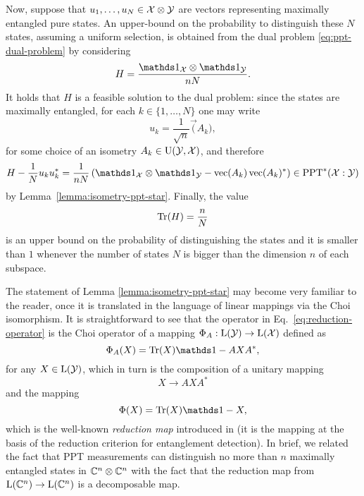 Now, suppose that $u_1,\ldots,u_N\in\mathcal{X}\otimes\mathcal{Y}$ are vectors representing
maximally entangled pure states.
An upper-bound on the probability to distinguish these $N$ states, assuming
a uniform selection, is obtained from the dual problem \eqref{eq:ppt-dual-problem}
by considering
\begin{equation}
  H = \frac{\I_{\X}\otimes\I_{\Y}}{nN}.
\end{equation}
It holds that $H$ is a feasible solution to the dual problem:
since the states are maximally entangled, for each $k\in\{1,\ldots,N\}$ one may write
\begin{equation}
  u_k = \frac{1}{\sqrt{n}}\vec(A_k),
\end{equation}
for some choice of an isometry $A_k\in\mathrm{U}(\mathcal{Y},\mathcal{X})$, and therefore
\begin{equation}
  H - \frac{1}{N}u_k u_k^{\ast} = \frac{1}{nN}\left(
  \I_{\X}\otimes\I_{\Y} - \vec(A_k) \vec(A_k)^{\ast}\right) \in \PPTStar(\X:\Y)
\end{equation}
by Lemma~\ref{lemma:isometry-ppt-star}.
Finally, the value
\begin{equation}
\operatorname{Tr}(H) = \frac{n}{N}
\end{equation}
is an upper bound on the probability of distinguishing the states and it is smaller 
than $1$ whenever the number of states $N$ is bigger than the dimension $n$ of
each subspace.
\begin{remark}
The statement of Lemma \ref{lemma:isometry-ppt-star} may become very familiar to the reader, 
once it is translated in the language of linear mappings via the Choi isomorphism.
It is straightforward to see that the operator in Eq.~\eqref{eq:reduction-operator}
is the Choi operator of a mapping $\Phi_{A}:\mathrm{L}(\mathcal{Y})\to\mathrm{L}(\mathcal{X})$ defined as
\begin{equation}
  \Phi_{A}(X) = \tr(X)\I - AXA^{\ast},
\end{equation}
for any $X\in\mathrm{L}(\mathcal{Y})$, which in turn is the composition of a unitary mapping
\begin{equation}
  X \to AXA^{\ast}
\end{equation}
and the mapping
\begin{equation}
  \Phi(X) = \tr(X)\I - X,
\end{equation}
which is the well-known \emph{reduction map} introduced in \cite{Horodecki99} 
(it is the mapping at the basis of the reduction criterion for entanglement detection).
In brief, we related the fact that PPT measurements can distinguish no more than 
$n$ maximally entangled states in $\mathbb{C}^{n}\otimes\mathbb{C}^{n}$ with the fact
that the reduction map from $\mathrm{L}(\mathbb{C}^{n})\to\mathrm{L}(\mathbb{C}^{n})$ is a decomposable map.
\end{remark}

